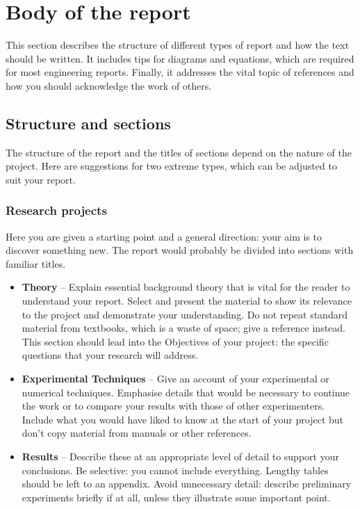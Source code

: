 \section{Body of the report}

This section describes the structure of different types of report and how the
text should be written. It includes tips for diagrams and equations, which are
required for most engineering reports. Finally, it addresses the vital topic of
references and how you should acknowledge the work of others.

\subsection{Structure and sections}

The structure of the report and the titles of sections depend on the nature of
the project. Here are suggestions for two extreme types, which can be adjusted
to suit your report.

\subsubsection{Research projects}

Here you are given a starting point and a general direction: your aim is to
discover something new. The report would probably be divided into sections with
familiar titles.

\begin{itemize}
    \item \textbf{Theory} {--} Explain essential background theory that is vital
          for the reader to understand your report. Select and present the
          material to show its relevance to the project and demonstrate your
          understanding. Do not repeat standard material from textbooks, which
          is a waste of space; give a reference instead. This section should
          lead into the Objectives of your project: the specific questions that
          your research will address.
    \item \textbf{Experimental Techniques} {--} Give an account of your
          experimental or numerical techniques. Emphasise details that would be
          necessary to continue the work or to compare your results with those
          of other experimenters. Include what you would have liked to know at
          the start of your project but don’t copy material from manuals or
          other references.
    \item \textbf{Results} {--} Describe these at an appropriate level of detail to
          support your conclusions. Be selective: you cannot include everything.
          Lengthy tables should be left to an appendix. Avoid unnecessary
          detail: describe preliminary experiments briefly if at all, unless
          they illustrate some important point.
\end{itemize}

